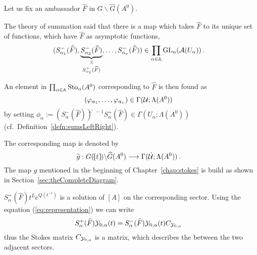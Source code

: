 Let us fix an ambassador $\hat F$ in $G\backslash\hat G(A^0)$.
\begin{rem}
  The theory of summation said that there is a map which takes $\hat F$ to its
  unique set of functions, which have $\hat F$ as asymptotic functions,
  \[
    (S_{\alpha_1}^-(\hat F),
    \underset{S_{\alpha_1}^+(\hat F)}{
      \underset{\text{\rotatebox[origin=c]{-90}{$=$}}}{\underbrace{
          S_{\alpha_2}^-(\hat F)
        }}}
    ,\dots,S_{\alpha_\nu}^-(\hat F))\in
    \prod_{\alpha\in\A}\Gl_n(\cA(U_\alpha)) \,.
  \]
\end{rem}
An element in $\prod_{\alpha\in\mathbb{A}}\operatorname{Sto}_\alpha(A^0)$ corresponding to $\hat F$ is
then found as
\[
  (\varphi_{\alpha_1},\dots,\varphi_{\alpha_\nu})
  \in\Gamma(\mathcal{U};\Lambda(A^0))
\]
by setting $\phi_\alpha:=
\left(S^-_\alpha(\hat F)\right)̂^{̀-1}S^+_\alpha(\hat F)\in\Gamma(U_\alpha;\Lambda(A^0))$
(cf.\ Definition~\ref{defn:sumsLeftRight}).
\begin{defn}\label{defn:theMapG}
  The corresponding map is denoted by
  \[
    \widetilde g:G(\!\{t\}\!)\backslash\widehat G(A^0)
    \longrightarrow
    \Gamma(\dot{\mathcal{U}};\Lambda(A^0)) \,.
  \]
  The map $g$ mentioned in the beginning of Chapter~\ref{chap:stokes} is build
  as shown in Section~\ref{sec:theCompleteDiagram}.
\end{defn}
\begin{rem}
  $S^+_\alpha(\hat F)t^Le^{Q(t^{-1})}$ is a solution of $[A]$ on the
  corresponding sector.
  Using the equation (\ref{eq:representation}) we can write
  \[
    S^+_\alpha(\widehat F)
    \mathcal{Y}_{0,\alpha}(t)
    =
    S^-_\alpha(\widehat F)
    \mathcal{Y}_{0,\alpha}(t)C_{\mathcal{Y}_{0,\alpha}}
  \]
  thus the Stokes matrix $C_{\mathcal{Y}_{0,\alpha}}$ is a matrix, which
  describes the  between the two adjacent sectors.
\end{rem}

